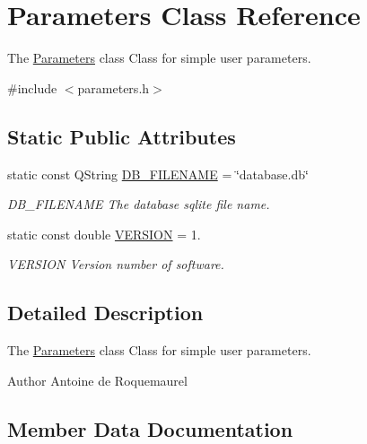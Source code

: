 \hypertarget{classParameters}{}\section{Parameters Class Reference}
\label{classParameters}


The \hyperlink{classParameters}{Parameters} class Class for simple user parameters.  




{\ttfamily \#include $<$parameters.\+h$>$}

\subsection*{Static Public Attributes}
\begin{DoxyCompactItemize}
\item 
static const Q\+String \hyperlink{classParameters_a80b98bd51d910bcc2203afcacbc7df87}{D\+B\+\_\+\+F\+I\+L\+E\+N\+A\+M\+E} = \char`\"{}database.\+db\char`\"{}
\begin{DoxyCompactList}\small\item\em D\+B\+\_\+\+F\+I\+L\+E\+N\+A\+M\+E The database sqlite file name. \end{DoxyCompactList}\item 
static const double \hyperlink{classParameters_a279ee24140c761de46178daa8960bdc8}{V\+E\+R\+S\+I\+O\+N} = 1.
\begin{DoxyCompactList}\small\item\em V\+E\+R\+S\+I\+O\+N Version number of software. \end{DoxyCompactList}\end{DoxyCompactItemize}


\subsection{Detailed Description}
The \hyperlink{classParameters}{Parameters} class Class for simple user parameters. 

\begin{DoxyAuthor}{Author}
Antoine de Roquemaurel 
\end{DoxyAuthor}


\subsection{Member Data Documentation}
\hypertarget{classParameters_a80b98bd51d910bcc2203afcacbc7df87}{}
